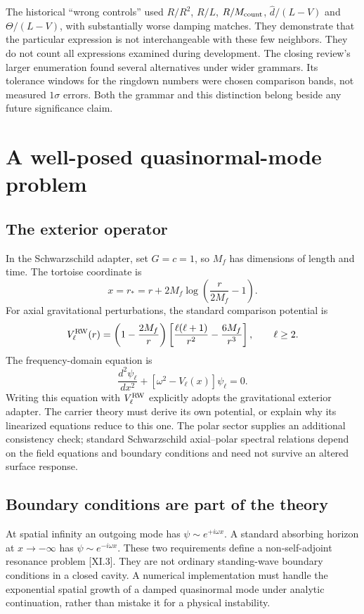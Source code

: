 The historical ``wrong controls'' used $R/R^2$, $R/L$, $R/M_{\rm count}$, $\widehat d/(L-V)$ and $\Theta/(L-V)$, with substantially worse damping matches. They demonstrate that the particular expression is not interchangeable with these few neighbors. They do not count all expressions examined during development. The closing review's larger enumeration found several alternatives under wider grammars. Its tolerance windows for the ringdown numbers were chosen comparison bands, not measured $1\sigma$ errors. Both the grammar and this distinction belong beside any future significance claim.

\section{A well-posed quasinormal-mode problem}
\subsection{The exterior operator}
In the Schwarzschild adapter, set $G=c=1$, so $M_f$ has dimensions of length and time. The tortoise coordinate is
\begin{equation}
 x=r_* =r+2M_f\log\left(\frac{r}{2M_f}-1\right).
 \label{c11:tortoise}
\end{equation}
For axial gravitational perturbations, the standard comparison potential is
\begin{equation}
 V_\ell^{\rm RW}(r)=\left(1-\frac{2M_f}{r}\right)
 \left[\frac{\ell(\ell+1)}{r^2}-\frac{6M_f}{r^3}\right],
 \qquad \ell\geq2.
 \label{c11:rw}
\end{equation}
The frequency-domain equation is
\begin{equation}
 \frac{d^2\psi_\ell}{dx^2}
 +\left[\omega^2-V_\ell(x)\right]\psi_\ell=0.
 \label{c11:eigenproblem}
\end{equation}
Writing this equation with $V_\ell^{\rm RW}$ explicitly adopts the gravitational exterior adapter. The carrier theory must derive its own potential, or explain why its linearized equations reduce to this one. The polar sector supplies an additional consistency check; standard Schwarzschild axial--polar spectral relations depend on the field equations and boundary conditions and need not survive an altered surface response.

\subsection{Boundary conditions are part of the theory}
At spatial infinity an outgoing mode has $\psi\sim e^{+i\omega x}$. A standard absorbing horizon at $x\to-\infty$ has $\psi\sim e^{-i\omega x}$. These two requirements define a non-self-adjoint resonance problem [XI.3]. They are not ordinary standing-wave boundary conditions in a closed cavity. A numerical implementation must handle the exponential spatial growth of a damped quasinormal mode under analytic continuation, rather than mistake it for a physical instability.

